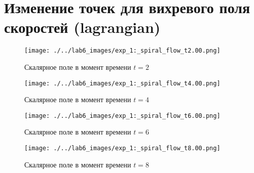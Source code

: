 \chapter{Изменение точек для вихревого поля скоростей (lagrangian)}
\label{app:vortex_lg}

\begin{figure}[h]
	\centering
	\texttt{[image: ./../lab6\_images/exp\_1:\_spiral\_flow\_t2.00.png]}
	\caption{Скалярное поле в момент времени $t=2$ }
\end{figure}
\begin{figure}[h]
	\centering
	\texttt{[image: ./../lab6\_images/exp\_1:\_spiral\_flow\_t4.00.png]}
	\caption{Скалярное поле в момент времени $t=4$ }
\end{figure}
\begin{figure}[h]
	\centering
	\texttt{[image: ./../lab6\_images/exp\_1:\_spiral\_flow\_t6.00.png]}
	\caption{Скалярное поле в момент времени $t=6$ }
\end{figure}
\begin{figure}[h]
	\centering
	\texttt{[image: ./../lab6\_images/exp\_1:\_spiral\_flow\_t8.00.png]}
	\caption{Скалярное поле в момент времени $t=8$ }
\end{figure}